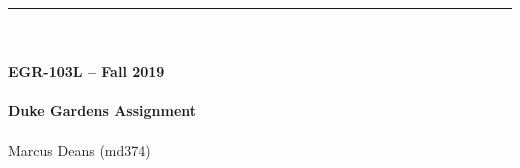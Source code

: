 \documentclass{article}
\begin{document}
\begin{center}
\rule{3.0in}{0.4mm}\\~\\
\textbf{\small EGR-103L -- Fall 2019}\\~\\
\textbf{\large Duke Gardens Assignment}\\~\\
Marcus Deans (md374)\\
\end{center}
\end{document}
